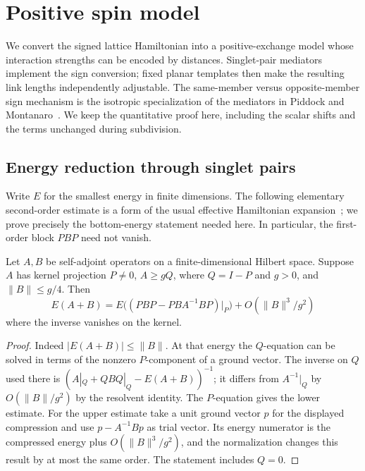 \section{Positive spin model}\label{sec:spin}

We convert the signed lattice Hamiltonian into a positive-exchange model
whose interaction strengths can be encoded by distances. Singlet-pair
mediators implement the sign conversion; fixed planar templates then
make the resulting link lengths independently adjustable. The
same-member versus opposite-member sign mechanism is the isotropic
specialization of the mediators in
Piddock and Montanaro~\cite[Section 2.4 and Lemma 5]{PiddockMontanaro2017}.
We keep the quantitative proof here, including the scalar shifts and
the terms unchanged during subdivision.

\subsection{Energy reduction through singlet pairs}

Write \(E\) for the smallest energy in finite dimensions. The following
elementary second-order estimate is a form of the usual effective
Hamiltonian expansion~\cite[Section 3.2]{BDL2011}; we prove precisely the
bottom-energy statement needed here. In particular, the first-order
block \(PBP\) need not vanish.

\begin{lemma}\label{lem:perturbation}
Let \(A,B\) be self-adjoint operators on a finite-dimensional Hilbert
space. Suppose \(A\) has kernel projection \(P\ne0\),
\(A\ge gQ\), where \(Q=I-P\) and \(g>0\), and
\(\|B\|\le g/4\). Then
\[
 E(A+B)=E\big((PBP-PBA^{-1}BP)|_P\big)+O(\|B\|^3/g^2)
\]
where the inverse vanishes on the kernel.
\end{lemma}
\begin{proof}
Indeed \(|E(A+B)|\le\|B\|\). At that energy the \(Q\)-equation can be solved in terms of the nonzero \(P\)-component of a ground vector. The inverse on \(Q\) used there is \((A|_Q+QBQ|_Q-E(A+B))^{-1}\); it differs from \(A^{-1}|_Q\) by \(O(\|B\|/g^2)\) by the resolvent identity. The \(P\)-equation gives the lower estimate. For the upper estimate take a unit ground vector \(p\) for the displayed compression and use \(p-A^{-1}Bp\) as trial vector. Its energy numerator is the compressed energy plus \(O(\|B\|^3/g^2)\), and the normalization changes this result by at most the same order. The statement includes \(Q=0\).
\end{proof}

